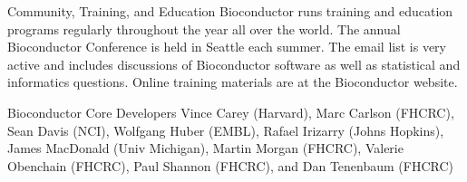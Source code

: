 \documentclass[final]{beamer}
\begin{document}
\begin{frame}[t]
\begin{columns}[t]
\begin{column}{0.24\linewidth}
\begin{block}{Community, Training, and Education}
\small{Bioconductor runs training and education programs regularly throughout the year all over the world.  The annual Bioconductor Conference is held in Seattle each summer.  The email list is very active and includes discussions of Bioconductor software as well as statistical and informatics questions.  Online training materials are at the Bioconductor website.}
      \end{block}
      \begin{block}{Bioconductor Core Developers}
        \small{Vince Carey (Harvard), Marc Carlson (FHCRC), Sean Davis (NCI), Wolfgang Huber (EMBL), Rafael Irizarry (Johns Hopkins), James MacDonald (Univ Michigan), Martin Morgan (FHCRC), Valerie Obenchain (FHCRC), Paul Shannon (FHCRC), and Dan Tenenbaum (FHCRC)}
      \end{block}
    \end{column}
    \end{columns}
  \end{frame}
\end{document}
